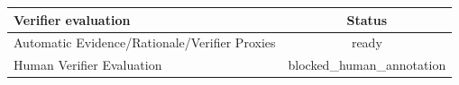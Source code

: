 \begin{tabular}{lc}
\toprule
Verifier evaluation & Status \\ 
\midrule
Automatic Evidence/Rationale/Verifier Proxies & ready \\
Human Verifier Evaluation & blocked\_human\_annotation \\
\bottomrule
\end{tabular}
